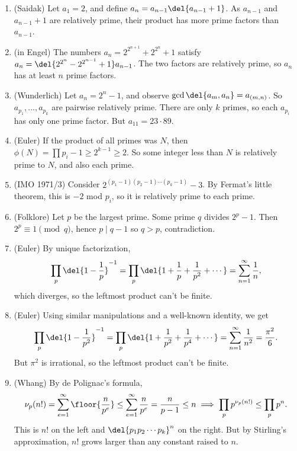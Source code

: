 \documentclass[11pt,paper=letter]{scrartcl}
\begin{document}
\begin{enumerate}
\item (Saidak) Let $a_1 = 2$, and define $a_n = a_{n-1}\del{a_{n-1} + 1}$. As $a_{n-1}$ and $a_{n-1} + 1$ are relatively prime, their product has more prime factors than $a_{n-1}$.

\item (in Engel) The numbers $a_n = 2^{2^{n+1}} + 2^{2^n} + 1$ satisfy $a_n = \del{2^{2^n} - 2^{2^{n-1}} + 1}a_{n-1}$. The two factors are relatively prime, so $a_n$ has at least $n$ prime factors.

\item (Wunderlich) Let $a_n = 2^n - 1$, and observe $\gcd\del{a_m, a_n} = a_{(m, n)}$. So $a_{p_1}, \ldots, a_{p_k}$ are pairwise relatively prime. There are only $k$ primes, so each $a_{p_i}$ has only one prime factor. But $a_{11} = 23 \cdot 89$.

\item (Euler) If the product of all primes was $N$, then $\phi(N) = \prod p_i - 1 \ge 2^{k - 1} \ge 2$. So some integer less than $N$ is relatively prime to $N$, and also each prime.

\item (IMO 1971/3) Consider $2^{(p_1 - 1)(p_2 - 1)\cdots(p_k - 1)} - 3$. By Fermat's little theorem, this is $-2$ mod $p_i$, so it is relatively prime to each prime.

\item (Folklore) Let $p$ be the largest prime. Some prime $q$ divides $2^p - 1$. Then $2^p \equiv 1 \pmod q$, hence $p \mid q - 1$ so $q > p$, contradiction.

\item (Euler) By unique factorization,
$$\prod_p \del{1 - \frac1p}^{-1} = \prod_p \del{1 + \frac1p + \frac1{p^2} + \cdots} = \sum_{n=1}^{\infty}\frac1n,$$
which diverges, so the leftmost product can't be finite.

\item (Euler) Using similar manipulations and a well-known identity, we get $$\prod_p \del{1 - \frac{1}{p^2}}^{-1}= \prod_p \del{1 + \frac1{p^2} + \frac1{p^4} + \cdots} = \sum_{n = 1}^{\infty} \frac{1}{n^2} = \frac{\pi^2}6.$$ But $\pi^2$ is irrational, so the leftmost product can't be finite.

\item (Whang) By de Polignac's formula, $$\nu_p(n!) = \sum_{e=1}^{\infty} \floor{\frac{n}{p^e}} \le \sum_{e=1}^{\infty} \frac n{p^e} = \frac{n}{p-1} \le n \implies \prod_p p^{\nu_p(n!)} \le \prod_p p^n.$$
This is $n!$ on the left and $\del{p_1p_2 \cdots p_k}^n$ on the right. But by Stirling's approximation, $n!$ grows larger than any constant raised to $n$.


\end{enumerate}
\end{document}
